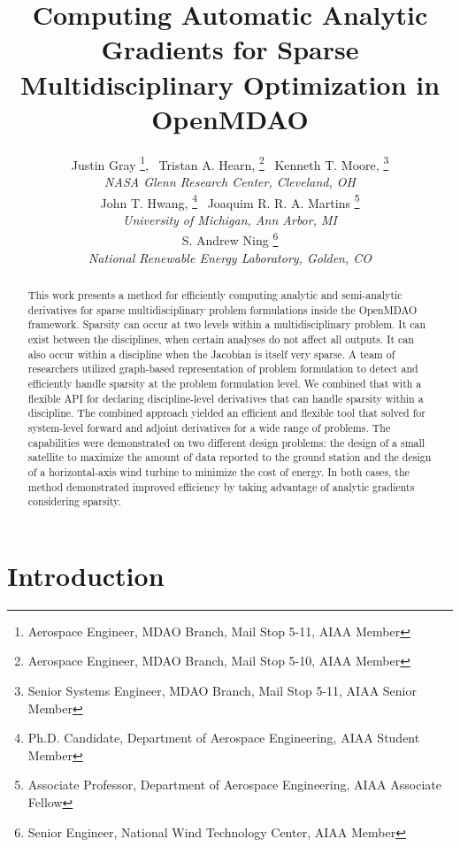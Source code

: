 \documentclass[]{aiaa-tc} %
\title{Computing Automatic Analytic Gradients for Sparse Multidisciplinary Optimization in OpenMDAO}
\author{
  Justin Gray%
     \thanks{Aerospace Engineer, MDAO Branch, Mail Stop 5-11, AIAA Member},
  \ Tristan A. Hearn,%
     \thanks{Aerospace Engineer, MDAO Branch, Mail Stop 5-10, AIAA Member}
  \ Kenneth T. Moore,%
     \thanks{Senior Systems Engineer, MDAO Branch, Mail Stop 5-11, AIAA Senior Member}
   \\
  {\normalsize\itshape
  NASA Glenn Research Center, Cleveland, OH}  \\
  John T. Hwang,%
  \thanks{Ph.D. Candidate, Department of Aerospace Engineering, AIAA Student Member}
  \ Joaquim R. R. A. Martins%
  \thanks{Associate Professor, Department of Aerospace Engineering, AIAA Associate Fellow}
  \\
  {\normalsize\itshape
   University of Michigan, Ann Arbor, MI}\\
  S. Andrew Ning
    \thanks{Senior Engineer, National Wind Technology Center, AIAA Member}
  \\
  {\normalsize\itshape
   National Renewable Energy Laboratory, Golden, CO}
}
\begin{document}
  \maketitle

  \begin{abstract}

  This work presents a method for efficiently computing analytic and semi-analytic derivatives for sparse multidisciplinary
  problem formulations inside the OpenMDAO framework. Sparsity can occur at two levels within a multidisciplinary problem.
  It can exist between the disciplines, when certain analyses do not affect all outputs. It can also occur within a discipline when
  the Jacobian is itself very sparse. A team of researchers utilized graph-based representation of problem formulation to detect and efficiently
  handle sparsity at the problem formulation level. We combined that with a flexible API for declaring discipline-level derivatives
  that can handle sparsity within a discipline. The combined approach yielded an efficient and flexible tool that solved
  for system-level forward and adjoint derivatives for a wide range of problems. The capabilities
  were demonstrated on two different design problems: the design of a small satellite to maximize the amount of data reported
  to the ground station and the design of a horizontal-axis wind turbine to minimize the cost of energy. In both cases, the
  method demonstrated improved efficiency by taking advantage of analytic gradients considering sparsity.

  \end{abstract}

  \section{Introduction}
\end{document}
